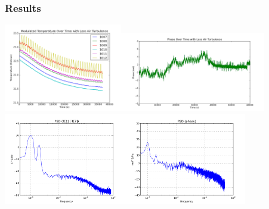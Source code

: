 \documentclass[notes, compressed, blue]{beamer}
\begin{document}
\begin{frame}
\frametitle{Results}

\begin{center}\includegraphics[width=2.03in]{ModulatedTemp.png}\includegraphics[width=2.5in]{phase260711.png}\\\includegraphics[width=2.1in]{PSD_mod12-7.png}\includegraphics[width=2.1in]{PSD_phasemod.png}\end{center}

\end{frame}
\end{document}
